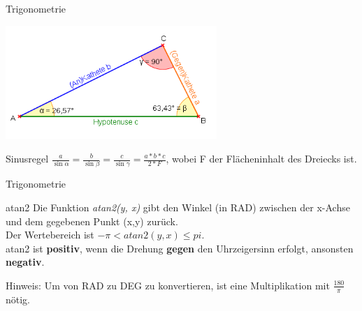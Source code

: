 \begin{frame}{Trigonometrie}
	\begin{center}
		\includegraphics[width=0.6\textwidth,height=.8\textheight,keepaspectratio]{dreieck.png}
	\end{center}
	
	\begin{exampleblock}{Sinusregel}
		$\frac{a}{\sin \alpha} = \frac{b}{\sin \beta} = \frac{c}{\sin \gamma} = \frac{a * b * c}{2 * F}$,
		wobei F der Flächeninhalt des Dreiecks ist.
	\end{exampleblock}
\end{frame}

\begin{frame}{Trigonometrie}
	\begin{exampleblock}{atan2}
		Die Funktion \textit{atan2(y, x)} gibt den Winkel (in RAD) zwischen der x-Achse und dem gegebenen Punkt (x,y) zurück.\\
		Der Wertebereich ist $-\pi < atan2(y, x) \leq pi$.\\
		atan2 ist \textbf{positiv}, wenn die Drehung \textbf{gegen} den Uhrzeigersinn erfolgt, ansonsten \textbf{negativ}.
	\end{exampleblock}
	
	Hinweis: Um von RAD zu DEG zu konvertieren, ist eine Multiplikation mit $\frac{180}{\pi}$ nötig.
\end{frame}